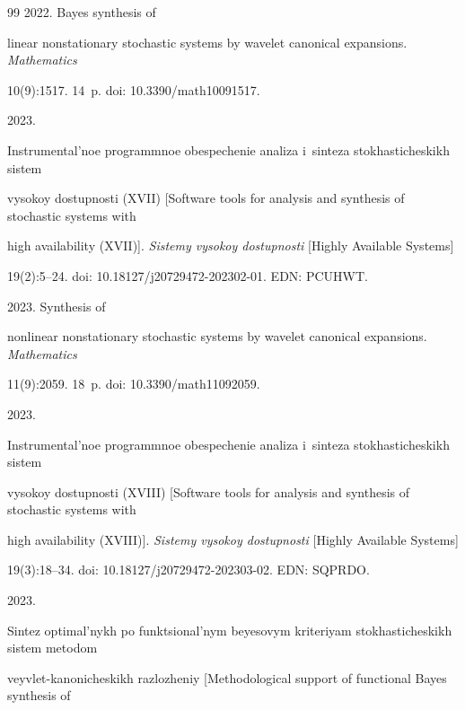 {{\begin{thebibliography}{99}
   2022. Bayes synthesis of 


linear nonstationary stochastic systems by wavelet canonical expansions. \textit{Mathematics} 


10(9):1517. 14~p. doi: 10.3390\!/\!math10091517.




   2023. 


Instrumental'noe programmnoe obespechenie analiza i~sinteza stokhasticheskikh sis\-tem 


vysokoy dostupnosti (XVII) [Software tools for analysis and synthesis of stochastic systems with 


high availability (XVII)]. \textit{Sistemy vysokoy dostupnosti} [Highly Available Systems]  


19(2):5--24. doi: 10.18127\!/\!j20729472-202302-01. EDN: PCUHWT.




   2023. Synthesis of 


nonlinear nonstationary stochastic systems by wavelet canonical expansions. \textit{Mathematics} 


11(9):2059. 18~p. doi: 10.3390\!/\!math11092059.




   2023. 


Instrumental'noe programmnoe obespechenie analiza i~sinteza stokhasticheskikh sistem 


vysokoy dostupnosti (XVIII) [Software tools for analysis and synthesis of stochastic systems with 


high availability (XVIII)]. \textit{Sistemy vysokoy dostupnosti} [Highly Available Systems] 


19(3):18--34. doi: 10.18127\!/\!j20729472-202303-02. EDN: SQPRDO.




   2023. 


Sintez optimal'nykh po funktsional'nym beyesovym kriteriyam stokhasticheskikh sistem metodom 


veyvlet-kanonicheskikh razlozheniy [Methodological support of functional Bayes synthesis of 



\end{thebibliography}}}
